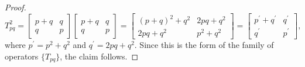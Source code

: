 \documentclass{article}
\begin{document}
\begin{proof}
  \begin{equation*}
    T_{pq}^2 =
    \begin{bmatrix}
      p + q & q \\
      q     & p
    \end{bmatrix}
    \begin{bmatrix}
      p + q & q \\
      q     & p
    \end{bmatrix}
    =
    \begin{bmatrix}
      (p + q)^2 + q^2 & 2pq + q^2 \\
      2pq + q^2        & p^2 + q^2
    \end{bmatrix}
    =
    \begin{bmatrix}
      p^{\prime} + q^{\prime} & q^{\prime} \\
      q^{\prime}             & p^{\prime}
    \end{bmatrix},
  \end{equation*}
  where $p^{\prime} = p^2 + q^2$ and $q^{\prime} = 2pq + q^2$.  Since this is
  the form of the family of operators $\{T_{pq}\}$, the claim follows.
\end{proof}
\vspace{5mm}
\end{document}
